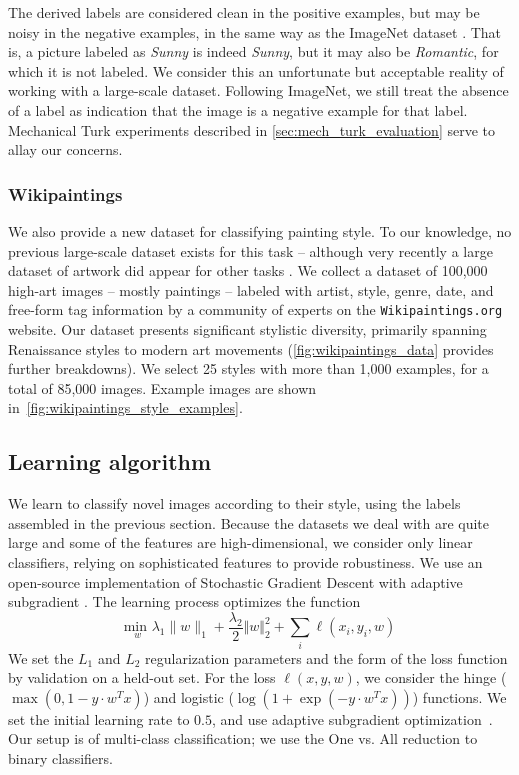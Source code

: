 The derived labels are considered clean in the positive examples, but may be noisy in the negative examples, in the same way as the ImageNet dataset \parencite{Deng-CVPR-2009}.
That is, a picture labeled as \emph{Sunny} is indeed \emph{Sunny}, but it may also be \emph{Romantic}, for which it is not labeled.
We consider this an unfortunate but acceptable reality of working with a large-scale dataset.
Following ImageNet, we still treat the absence of a label as indication that the image is a negative example for that label.
Mechanical Turk experiments described in \autoref{sec:mech_turk_evaluation} serve to allay our concerns.

\subsubsection{Wikipaintings}

We also provide a new dataset for classifying painting style.
To our knowledge, no previous large-scale dataset exists for this task -- although very recently a large dataset of artwork did appear for other tasks \parencite{Mensink2014}.
We collect a dataset of 100,000 high-art images -- mostly paintings -- labeled with artist, style, genre, date, and free-form tag information by a community of experts on the \texttt{Wikipaintings.org} website.
Our dataset presents significant stylistic diversity, primarily spanning Renaissance styles to modern art movements (\autoref{fig:wikipaintings_data} provides further breakdowns).
We select 25 styles with more than 1,000 examples, for a total of 85,000 images.
Example images are shown in~\autoref{fig:wikipaintings_style_examples}.

\subsection{Learning algorithm}

We learn to classify novel images according to their style, using the labels assembled in the previous section.
Because the datasets we deal with are quite large and some of the features are high-dimensional, we consider only linear classifiers, relying on sophisticated features to provide robustiness.
We use an open-source implementation of Stochastic Gradient Descent with adaptive subgradient \parencite{Agarwal-JMLR-2012}.
The learning process optimizes the function \[
\underset{w}{\text{min }} \lambda_1 \|w\|_1 + \frac{\lambda_2}{2} \Vert w \Vert_2^2 + \sum_i \ell(x_i, y_i, w)
\]
We set the $L_1$ and $L_2$ regularization parameters and the form of the loss function by validation on a held-out set.
For the loss $\ell(x, y, w)$, we consider the hinge ($\max(0, 1 - y \cdot w^T x)$) and logistic ($\log(1 + \exp(-y \cdot w^T x))$) functions.
We set the initial learning rate to $0.5$, and use adaptive subgradient optimization~\parencite{duchi2011adaptive}.
Our setup is of multi-class classification; we use the One vs. All reduction to binary classifiers.

